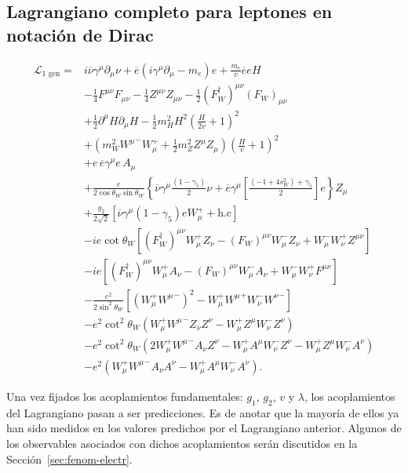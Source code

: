 \subsection{Lagrangiano completo para leptones en notación de Dirac}
\begin{frame}
\begin{align}
\label{eq:lsmw}
  \mathcal{L}_{\text{1 gen}}=&
  i\overline{\nu}\gamma^\mu\partial_\mu\nu                               
+  \overline{e}\left(i\gamma^\mu\partial_\mu-m_e\right)e
 +\frac{m_e}{v}\overline{e}e H
\nonumber\\
&-\tfrac{1}{4}F^{\mu\nu} F_{\mu\nu}-\tfrac{1}{4}Z^{\mu\nu} Z_{\mu\nu}-\tfrac{1}{2}(F_W^\dagger)^{\mu\nu} (F_W)_{\mu\nu}
\nonumber\\
&+\tfrac{1}{2}\partial^\mu H\partial_\mu H
-\frac{1}{2}m_H^2H^2\left(\frac{H}{2v}+1\right)^2\nonumber\\
&+\left(m_W^2{W^\mu}^-W_\mu^++\frac{1}{2}m_Z^2Z^\mu Z_\mu\right)\left(\frac{H}{v}+1\right)^2\nonumber\\
 &+e\, \overline{e}\gamma^{\mu}e\, A_\mu \nonumber\\
 &+\frac{e}{2\cos\theta_W \sin\theta_W}                             
\left\{
\overline{\nu}\gamma^{\mu}\frac{\left( 1 -\gamma_5 \right)}{2}\nu
   + \overline{e} \gamma^{\mu} \left[ \frac{\left(-1+ 4s_W^2 \right)+\gamma_5}{2}\right]e
 \right\} Z_\mu \nonumber\\
 &+\frac{g_2}{2\sqrt{2}}\left[
\overline{\nu}\gamma^\mu(1-\gamma_5)eW_\mu^++\text{h.c}\right] \nonumber\\
&-ie\cot\theta_W\left[(F_W^\dagger)^{\mu\nu}W_\mu^+ Z_\nu-(F_W)^{\mu\nu}W_\mu^- Z_\nu+W_\mu^-W_\nu^+Z^{\mu\nu}\right]\nonumber\\
&-ie\left[(F_W^\dagger)^{\mu\nu}W_\mu^+ A_\nu-(F_W)^{\mu\nu}W_\mu^- A_\nu+W_\mu^-W_\nu^+F^{\mu\nu}\right]\nonumber\\
&-\frac{e^2}{2\sin^2\theta_W}\left[\left(W_\mu^+{W^\mu}^-\right)^2-W_\mu^+{W^\mu}^+W_\nu^-{W^\nu}^-\right]\nonumber\\
&-e^2\cot^2\theta_W\left(W_\mu^+{W^\mu}^-Z_\nu Z^\nu-W_\mu^+Z^\mu W_\nu^-Z^\nu\right)\nonumber\\
&-e^2\cot^2\theta_W\left(2W_\mu^+{W^\mu}^-A_\nu Z^\nu-W_\mu^+A^\mu W_\nu^-Z^\nu-W_\mu^+Z^\mu W_\nu^-A^\nu\right)\nonumber\\
&-e^2\left(W_\mu^+{W^\mu}^-A_\nu A^\nu-W_\mu^+A^\mu W_\nu^-A^\nu\right).
\end{align}
\end{frame}
Una vez fijados los acoplamientos fundamentales: $g_1$, $g_2$, $v$ y $\lambda$, los acoplamientos del Lagrangiano pasan a ser predicciones. Es de anotar que la mayoría de ellos ya han sido medidos en los valores predichos por el Lagrangiano anterior. Algunos de los observables asociados con dichos acoplamientos serán discutidos en la Sección~\ref{sec:fenom-electr}.


